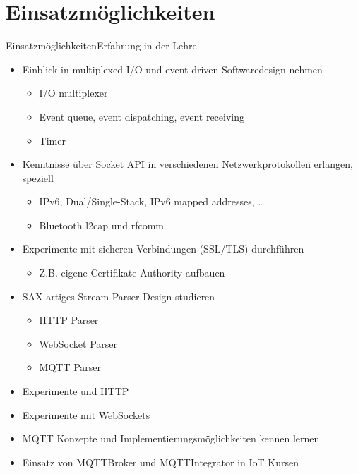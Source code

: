 ﻿

\part{Einsatzmöglichkeiten}
\begin{frame}{Einsatzmöglichkeiten}{Erfahrung in der Lehre}
  \begin{itemize}
    \item Einblick in multiplexed I/O und event-driven Softwaredesign nehmen
    \begin{itemize}
      \item I/O multiplexer
      \item Event queue, event dispatching, event receiving
      \item Timer
    \end{itemize}
    \item Kenntnisse über Socket API in verschiedenen Netzwerkprotokollen erlangen, speziell
    \begin{itemize}
      \item IPv6, Dual/Single-Stack, IPv6 mapped addresses, \ldots
      \item Bluetooth l2cap und rfcomm
    \end{itemize}
    \item Experimente mit sicheren Verbindungen (SSL/TLS) durchführen
    \begin{itemize}
      \item Z.B. eigene Certifikate Authority aufbauen
    \end{itemize}
    \item SAX-artiges Stream-Parser Design studieren
    \begin{itemize}
      \item HTTP Parser
      \item WebSocket Parser
      \item MQTT Parser
    \end{itemize}
    \item Experimente und HTTP
    \item Experimente mit WebSockets
    \item MQTT Konzepte und Implementierungsmöglichkeiten kennen lernen
    \item Einsatz von MQTTBroker und MQTTIntegrator in IoT Kursen
  \end{itemize}
\end{frame}
